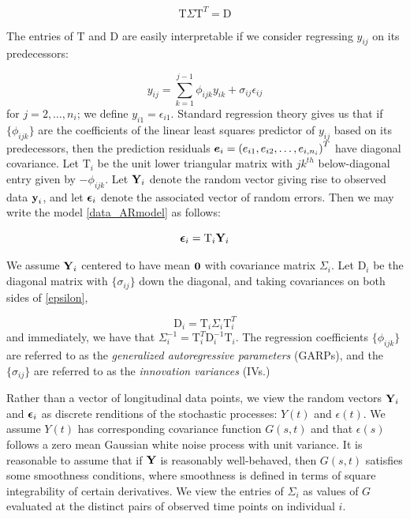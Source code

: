 \documentclass[12pt]{article}
\newcommand{\bfeps}{\mbox{\boldmath $\epsilon$}}
\newcommand{\bfe}{\mbox{\boldmath $e$}}
\newcommand{\bfo}{\mbox{\boldmath $0$}}
\newcommand{\bfy}{\mbox{\bf y}}
\newcommand{\bfY}{\mbox{\bf Y}}
\newcommand{\matD}{\mbox{D}}
\newcommand{\matT}{\mbox{T}}
\begin{document}
\begin{equation}
\nonumber \matT \Sigma \matT^T = \matD
\end{equation}
\noindent

The entries of $\matT$ and $\matD$ are easily interpretable if we consider regressing $y_{ij}$ on its predecessors: 

\begin{equation}
{y}_{ij}  = \sum_{k=1}^{j-1} \phi_{ijk} y_{ik} + \sigma_{ij}\epsilon_{ij} \label{data_ARmodel}
\end{equation}
\noindent
for $j=2,\dots,n_i$; we define $y_{i1}=\epsilon_{i1}$. Standard regression theory gives us that if $\lbrace \phi_{ijk} \rbrace$ are the coefficients of the linear least squares predictor of $y_{ij}$ based on its predecessors, then the prediction residuals $\bfe_i =\left( e_{i1}, e_{i2},\dots, e_{i,n_i} \right)^T$ have diagonal covariance. Let $\matT_i$ be the unit lower triangular matrix with $jk^{th}$ below-diagonal entry given by $-\phi_{ijk}$. Let $\bfY_i$ denote the random vector giving rise to observed data $\bfy_i$, and let $\bfeps_i$ denote the associated vector of random errors. Then we may write the model \eqref{data_ARmodel} as follows: 

\begin{equation}
\bfeps_i = \matT_i \bfY_i \label{epsilon}
\end{equation}

We assume $\bfY_i$ centered to have mean $\bfo$ with covariance matrix $\Sigma_i$. Let $\matD_i$ be the diagonal matrix with $\lbrace \sigma_{ij} \rbrace$ down the diagonal, and taking covariances on both sides of \eqref{epsilon}, 

\begin{equation}
\nonumber
\matD_i = \matT_i \Sigma_i \matT_i^T
\end{equation} 
\noindent
and immediately, we have that $\Sigma_i^{-1} = \matT_i^T \matD_i^{-1} \matT_i$. The regression coefficients $\lbrace \phi_{ijk} \rbrace$ are referred to as the \emph{generalized autoregressive parameters} (GARPs), and the $\lbrace \sigma_{ij} \rbrace$ are referred to as the \emph{innovation variances} (IVs.) 


Rather than a vector of longitudinal data points, we view the random vectors $\bfY_i$ and $\bfeps_i$ as discrete renditions of the stochastic processes: $Y\left(t\right)$ and $\epsilon\left(t\right)$.  We assume $Y\left(t\right)$ has corresponding covariance function $G\left(s,t\right)$ and that $\epsilon\left(s\right)$ follows a zero mean Gaussian white noise process with unit variance. It is reasonable to assume that if $\bfY$ is reasonably well-behaved, then $G\left(s,t\right)$ satisfies some smoothness conditions, where smoothness is defined in terms of square integrability of certain derivatives. We view the entries of $\Sigma_i$ as values of $G$ evaluated at the distinct pairs of observed time points on individual $i$. 
\end{document}
